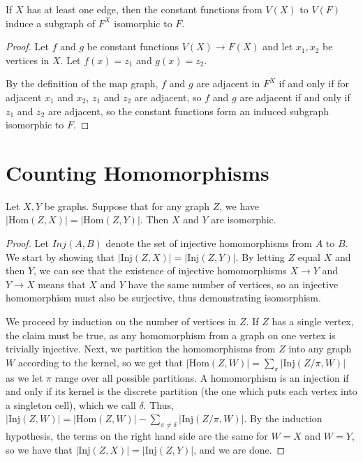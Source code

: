 \begin{lemma}
	If $X$ has at least one edge, then the constant functions from $V(X)$ to $V(F)$ induce a subgraph of $F^X$ isomorphic to $F$.
\end{lemma}
\begin{proof}
	Let $f$ and $g$ be constant functions $V(X)\rightarrow F(X)$ and let $x_1,x_2$ be vertices in $X$.  Let $f(x)=z_1$ and $g(x)=z_2$.
	
	By the definition of the map graph, $f$ and $g$ are adjacent in $F^X$ if and only if for adjacent $x_1$ and $x_2$, $z_1$ and $z_2$ are adjacent, so $f$ and $g$ are adjacent if and only if $z_1$ and $z_2$ are adjacent, so the constant functions form an induced subgraph isomorphic to $F$.
\end{proof}


\section*{Counting Homomorphisms}

\begin{lemma}
	Let $X,Y$ be graphs.  Suppose that for any graph $Z$, we have $|\mathrm{Hom}(Z,X)|=|\mathrm{Hom}(Z,Y)|$.  Then $X$ and $Y$ are isomorphic.
\end{lemma}

\begin{proof}
	Let $Inj(A,B)$ denote the set of injective homomorphisms from $A$ to $B$.  We start by showing that $|\mathrm{Inj}(Z,X)|=|\mathrm{Inj}(Z,Y)|$.  By letting $Z$ equal $X$ and then $Y$, we can see that the existence of injective homomorphisms $X\rightarrow Y$ and $Y\rightarrow X$ means that $X$ and $Y$ have the same number of vertices, so an injective homomorphism must also be surjective, thus demonstrating isomorphism.
	
	We proceed by induction on the number of vertices in $Z$.  If $Z$ has a single vertex, the claim must be true, as any homomorphism from a graph on one vertex is trivially injective.  Next, we partition the homomorphisms from $Z$ into any graph $W$ according to the kernel, so we get that $|\mathrm{Hom}(Z,W)|=\sum\limits_\pi |\mathrm{Inj}(Z/\pi,W)|$ as we let $\pi$ range over all possible partitions.  A homomorphism is an injection if and only if its kernel is the discrete partition (the one which puts each vertex into a singleton cell), which we call $\delta$.  Thus, $|\mathrm{Inj}(Z,W)|=|\mathrm{Hom}(Z,W)|-\sum\limits_{\pi\neq \delta}|\mathrm{Inj}(Z/\pi,W)|$.  By the induction hypothesis, the terms on the right hand side are the same for $W=X$ and $W=Y$, so we have that $|\mathrm{Inj}(Z,X)|=|\mathrm{Inj}(Z,Y)|$, and we are done.
\end{proof}

